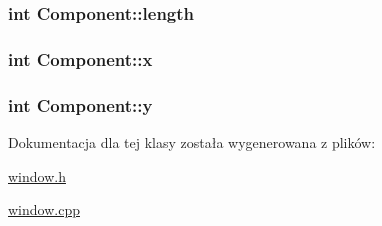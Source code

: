 \subsubsection[{\texorpdfstring{length}{length}}]{\setlength{\rightskip}{0pt plus 5cm}int Component\+::length\hspace{0.3cm}{\ttfamily [private]}}\hypertarget{classComponent_a4d25a50d4bfa8fde7f75478eadcd5661}{}\label{classComponent_a4d25a50d4bfa8fde7f75478eadcd5661}
\subsubsection[{\texorpdfstring{x}{x}}]{\setlength{\rightskip}{0pt plus 5cm}int Component\+::x\hspace{0.3cm}{\ttfamily [private]}}\hypertarget{classComponent_a3fe84cea3e41ac363349595e1a92a5b6}{}\label{classComponent_a3fe84cea3e41ac363349595e1a92a5b6}
\subsubsection[{\texorpdfstring{y}{y}}]{\setlength{\rightskip}{0pt plus 5cm}int Component\+::y\hspace{0.3cm}{\ttfamily [private]}}\hypertarget{classComponent_a3cbb2a0f076a05810ad64ac22ea10402}{}\label{classComponent_a3cbb2a0f076a05810ad64ac22ea10402}


Dokumentacja dla tej klasy została wygenerowana z plików\+:\begin{DoxyCompactItemize}
\item 
\hyperlink{window_8h}{window.\+h}\item 
\hyperlink{window_8cpp}{window.\+cpp}\end{DoxyCompactItemize}
